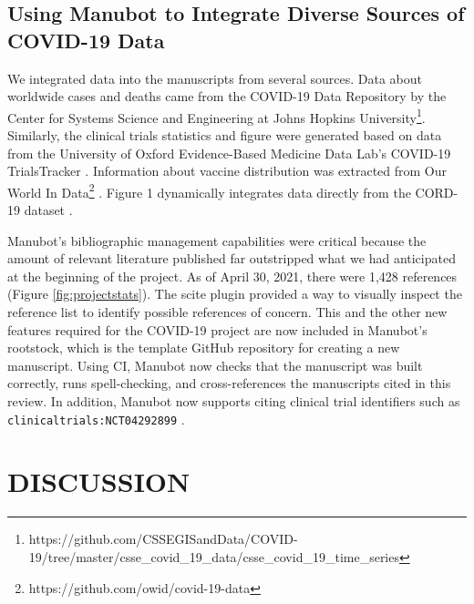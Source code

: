 \documentclass[twocolumn]{ceurart}
\begin{document}
\hypertarget{using-manubot-to-integrate-diverse-sources-of-covid-19-data}{%
\subsection{Using Manubot to Integrate Diverse Sources of COVID-19 Data}\label{using-manubot-to-integrate-diverse-sources-of-covid-19-data}}

We integrated data into the manuscripts from several sources.
Data about worldwide cases and deaths came from the COVID-19 Data Repository by the Center for Systems Science and Engineering at Johns Hopkins University\footnote{https://github.com/CSSEGISandData/COVID-19/tree/master/csse\_covid\_19\_data/csse\_covid\_19\_time\_series}.
Similarly, the clinical trials statistics and figure were generated based on data from the University of Oxford Evidence-Based Medicine Data Lab's COVID-19 TrialsTracker \citep{SSbnPnzT}.
Information about vaccine distribution was extracted from Our World In Data\footnote{https://github.com/owid/covid-19-data} \citep{ZHvhFakW}.
Figure 1 dynamically integrates data directly from the CORD-19 dataset \citep{CiOwklc6}.

Manubot's bibliographic management capabilities were critical because the amount of relevant literature published far outstripped what we had anticipated at the beginning of the project.
As of April 30, 2021, there were 1,428 references (Figure \ref{fig:projectstats}).
The scite plugin provided a way to visually inspect the reference list to identify possible references of concern.
This and the other new features required for the COVID-19 project are now included in Manubot's rootstock, which is the template GitHub repository for creating a new manuscript.
Using CI, Manubot now checks that the manuscript was built correctly, runs spell-checking, and cross-references the manuscripts cited in this review.
In addition, Manubot now supports citing clinical trial identifiers such as \texttt{clinicaltrials:NCT04292899} \citep{yTCAmOyt}.

\hypertarget{discussion}{%
\section{DISCUSSION}\label{discussion}}
\end{document}
